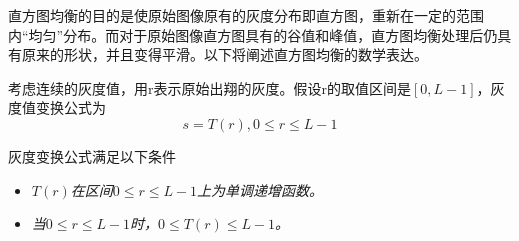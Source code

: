 \documentclass[12pt]{book}
\begin{document}
直方图均衡的目的是使原始图像原有的灰度分布即直方图，重新在一定的范围内“均匀”分布。而对于原始图像直方图具有的谷值和峰值，直方图均衡处理后仍具有原来的形状，并且变得平滑。以下将阐述直方图均衡的数学表达。

考虑连续的灰度值，用r表示原始出翔的灰度。假设r的取值区间是$[0,L-1]$，灰度值变换公式为
\begin{equation}s=T(r),0 \leq r\leq L-1 \end{equation}

灰度变换公式满足以下条件
			\begin{itemize}
				\item \emph{$T(r)$在区间$0\leq r\leq L-1$上为单调递增函数。}
				\item \emph{当$0\leq r\leq L-1$时，$0\leq T(r) \leq L-1$。}
			\end{itemize}
\end{document}
